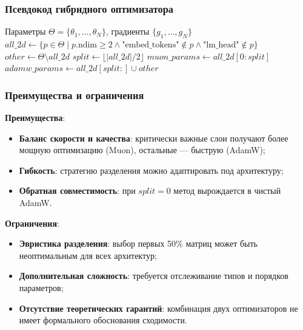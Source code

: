\documentclass[a4paper,12pt]{article}
\begin{document}
\subsubsection{Псевдокод гибридного оптимизатора}

\begin{algorithm}[H]
\caption{Hybrid: комбинированное обновление всех параметров}
\label{alg:hybrid}
\begin{algorithmic}[1]
\Require Параметры $\Theta = \{\theta_1, \ldots, \theta_N\}$, градиенты $\{g_1, \ldots, g_N\}$
\State {}
\State $all\_2d \gets \{ p \in \Theta \mid p.\text{ndim} \ge 2 \land \text{"embed\_tokens"} \notin p \land \text{"lm\_head"} \notin p \}$
\State $other \gets \Theta \setminus all\_2d$
\State {}
\State $split \gets \lfloor |all\_2d| / 2 \rfloor$
\State $muon\_params \gets all\_2d[0:split]$
\State $adamw\_params \gets all\_2d[split:] \cup other$
\State {}
\State \Return {}
\end{algorithmic}
\end{algorithm}

\subsubsection{Преимущества и ограничения}

\textbf{Преимущества}:
\begin{itemize}
    \item \textbf{Баланс скорости и качества}: критически важные слои получают более мощную оптимизацию (Muon), остальные --- быструю (AdamW);
    \item \textbf{Гибкость}: стратегию разделения можно адаптировать под архитектуру;
    \item \textbf{Обратная совместимость}: при $split = 0$ метод вырождается в чистый AdamW.
\end{itemize}

\textbf{Ограничения}:
\begin{itemize}
    \item \textbf{Эвристика разделения}: выбор первых 50\% матриц может быть неоптимальным для всех архитектур;
    \item \textbf{Дополнительная сложность}: требуется отслеживание типов и порядков параметров;
    \item \textbf{Отсутствие теоретических гарантий}: комбинация двух оптимизаторов не имеет формального обоснования сходимости.
\end{itemize}
\end{document}
